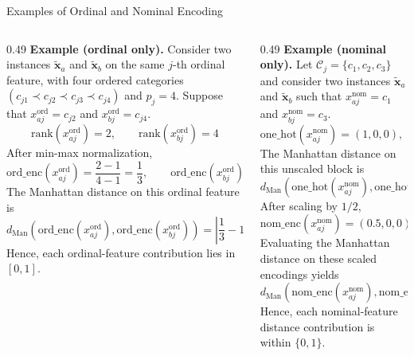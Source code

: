 \documentclass[10pt,aspectratio=169]{beamer}
\begin{document}
\begin{frame}{Examples of Ordinal and Nominal Encoding}
  \scriptsize
  \begin{columns}[T,onlytextwidth]
    \begin{column}{0.49\textwidth}
      \textbf{Example (ordinal only).} Consider two instances $\tilde{\mathbf{x}}_a$ and $\tilde{\mathbf{x}}_b$ on the same $j$-th ordinal feature, with four ordered categories $(c_{j1} \prec c_{j2} \prec c_{j3} \prec c_{j4})$ and $p_j = 4$. Suppose that $x^{\mathrm{ord}}_{aj} = c_{j2}$ and $x^{\mathrm{ord}}_{bj} = c_{j4}$.
      \begin{equation*}
        \mathrm{rank}(x^{\mathrm{ord}}_{aj}) = 2,\qquad \mathrm{rank}(x^{\mathrm{ord}}_{bj}) = 4
      \end{equation*}
      After min-max normalization,
      \begin{equation*}
        \mathrm{ord\_enc}(x^{\mathrm{ord}}_{aj}) = \frac{2-1}{4-1} = \frac{1}{3},\qquad
        \mathrm{ord\_enc}(x^{\mathrm{ord}}_{bj}) = \frac{4-1}{4-1} = 1
      \end{equation*}
      The Manhattan distance on this ordinal feature is
      \begin{equation*}
        d_{\mathrm{Man}}\!\left(\mathrm{ord\_enc}(x^{\mathrm{ord}}_{aj}),\mathrm{ord\_enc}(x^{\mathrm{ord}}_{bj})\right)
        = \left|\frac{1}{3}-1\right| = \frac{2}{3}
      \end{equation*}
      Hence, each ordinal-feature contribution lies in $[0,1]$.
    \end{column}
    \begin{column}{0.49\textwidth}
      \textbf{Example (nominal only).} Let $\mathcal{C}_j = \{c_1,c_2,c_3\}$ and consider two instances $\tilde{\mathbf{x}}_a$ and $\tilde{\mathbf{x}}_b$ such that $x^{\mathrm{nom}}_{aj} = c_1$ and $x^{\mathrm{nom}}_{bj} = c_3$.
      \begin{equation*}
        \mathrm{one\_hot}(x^{\mathrm{nom}}_{aj}) = (1,0,0),\qquad
        \mathrm{one\_hot}(x^{\mathrm{nom}}_{bj}) = (0,0,1)
      \end{equation*}
      The Manhattan distance on this unscaled block is
      \begin{equation*}
        d_{\mathrm{Man}}\!\left(\mathrm{one\_hot}(x^{\mathrm{nom}}_{aj}),\mathrm{one\_hot}(x^{\mathrm{nom}}_{bj})\right) = 2
      \end{equation*}
      After scaling by $1/2$,
      \begin{equation*}
        \mathrm{nom\_enc}(x^{\mathrm{nom}}_{aj}) = (0.5,0,0),\qquad
        \mathrm{nom\_enc}(x^{\mathrm{nom}}_{bj}) = (0,0,0.5)
      \end{equation*}
      Evaluating the Manhattan distance on these scaled encodings yields
      \begin{equation*}
        d_{\mathrm{Man}}\!\left(\mathrm{nom\_enc}(x^{\mathrm{nom}}_{aj}),\mathrm{nom\_enc}(x^{\mathrm{nom}}_{bj})\right) = 1
      \end{equation*}
      Hence, each nominal-feature distance contribution is within $\{0,1\}$.
    \end{column}
  \end{columns}
\end{frame}
\end{document}

